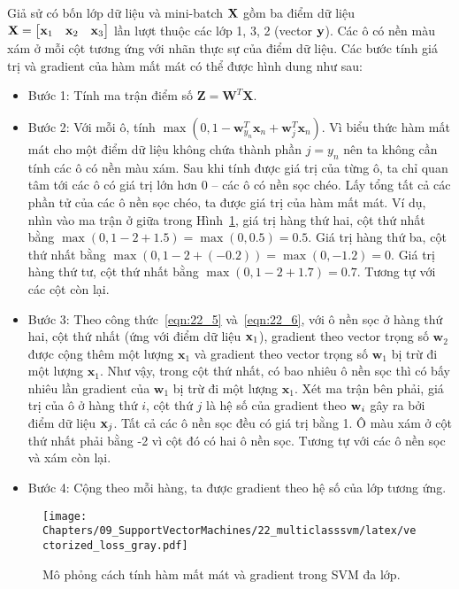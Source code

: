 Giả sử có bốn lớp dữ liệu và mini-batch $\mathbf{X}$ gồm ba điểm dữ liệu $\mathbf{X} = \left[\begin{matrix}
\mathbf{x}_1& \mathbf{x}_2 & \mathbf{x}_3\end{matrix}\right]$ lần lượt thuộc các lớp 1, 3, 2
(vector $\mathbf{y}$). Các ô có nền màu xám ở mỗi cột tương ứng với nhãn thực sự của
điểm dữ liệu. Các bước tính giá trị và {gradient} của hàm mất mát có thể được
hình dung như sau:
\begin{itemize}
\item {Bước 1:} Tính ma trận điểm số $\mathbf{Z} = \mathbf{W}^T\mathbf{X}$.

\item {Bước 2:} Với mỗi ô, tính $\max(0, 1 - \mathbf{w}_{y_n}^T
\mathbf{x}_n + \mathbf{w}_j^T\mathbf{x}_n)$. Vì biểu thức hàm mất mát cho một điểm dữ liệu không chứa thành phần $j = y_n$ nên ta không cần tính
các ô có nền màu xám. Sau khi tính được giá trị của từng ô, ta chỉ quan tâm
tới các ô có giá trị lớn hơn 0 -- các ô có nền sọc chéo. Lấy tổng tất cả các
phần tử của các ô nền sọc chéo, ta được giá trị của hàm mất mát. Ví dụ, nhìn
vào ma trận ở giữa trong Hình~\ref{fig:22_7}, giá trị hàng thứ hai, cột
thứ nhất bằng $\max(0, 1 - 2 + 1.5) = \max(0, 0.5) = 0.5$. Giá trị hàng
thứ ba, cột thứ nhất bằng $\max(0, 1 -2 + (-0.2)) = \max(0, -1.2) = 0$. Giá
trị hàng thứ tư, cột thứ nhất bằng $\max(0, 1 - 2 + 1.7) = 0.7$. Tương tự
với các cột còn lại.

\item {Bước 3:} Theo công thức~\eqref{eqn:22_5} và~\eqref{eqn:22_6},
với ô nền sọc ở hàng thứ hai, cột thứ nhất (ứng với điểm dữ liệu $\mathbf{x}_1$),
gradient theo vector trọng số $\mathbf{w}_2$ được cộng thêm một lượng
$\mathbf{x}_1$ và gradient theo vector trọng số $\mathbf{w}_1$ bị trừ đi một
lượng $\mathbf{x}_1$. Như vậy, trong cột thứ nhất, có bao nhiêu ô nền sọc
thì có bấy nhiêu lần gradient của $\mathbf{w}_1$ bị trừ đi một lượng
$\mathbf{x}_1$. Xét ma trận bên phải, giá trị của ô ở hàng thứ $i$, cột thứ
$j$ là hệ số của gradient theo $\mathbf{w}_i$ gây ra bởi điểm dữ liệu $\mathbf{x}_j$. Tất
cả các ô nền sọc đều có giá trị bằng 1. Ô màu xám ở cột thứ nhất phải bằng
-2 vì cột đó có hai ô nền sọc. Tương tự với các ô nền sọc và xám còn lại.

\item {Bước 4:} Cộng theo mỗi hàng, ta được gradient theo
hệ số của lớp tương ứng.
\end{itemize}
\begin{figure}[t]
\centering
\texttt{[image: Chapters/09\_SupportVectorMachines/22\_multiclasssvm/latex/vectorized\_loss\_gray.pdf]}
\caption[]{Mô phỏng cách tính hàm mất mát và gradient trong SVM đa lớp.} \label{fig:22_7}
\end{figure}

